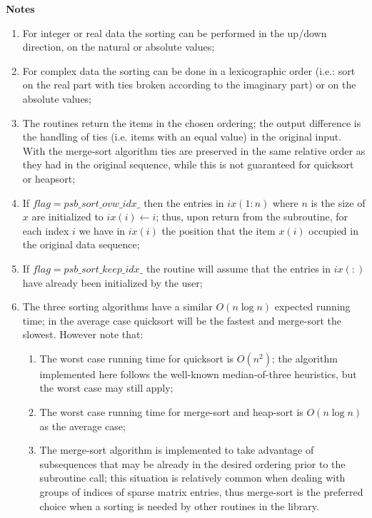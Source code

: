 {\goodbreak\par\noindent\large\bfseries Notes}
\begin{enumerate}
\item For integer or real data the sorting can be performed in the up/down direction, on the
  natural or absolute values;
\item For  complex data the sorting can  be done in a lexicographic
  order (i.e.: sort on the real part with ties broken according to
  the imaginary part) or on the absolute values; 
\item The routines return the items in the chosen ordering; the
  output difference is the handling of  ties (i.e. items with an
  equal   value) in the original input. With the merge-sort algorithm
  ties are   preserved in the same relative order as they had in the
  original   sequence,  while this is not guaranteed for quicksort or
  heapsort; 
\item If $flag = psb\_sort\_ovw\_idx\_$ then the entries in $ix(1:n)$
  where $n$ is the size of $x$ are initialized to $ix(i) \leftarrow
  i$; thus, upon return from the subroutine, for each
  index $i$ we have in $ix(i)$ the position that the item $x(i)$
  occupied in the original data sequence;
\item If $flag = psb\_sort\_keep\_idx\_$  the routine will assume that
  the entries in $ix(:)$ have already been initialized by the user;
\item The three sorting algorithms have a similar $O(n \log n)$ expected
  running time; in the average case quicksort will be the
  fastest and merge-sort the slowest. However note that:
\begin{enumerate}
\item The worst case running time for quicksort is $O(n^2)$; the algorithm
  implemented here follows the well-known median-of-three heuristics,
  but the worst case may still apply;
\item The worst case running time for merge-sort and heap-sort is
  $O(n\log n)$  as the average case;
\item The merge-sort algorithm is implemented to take advantage of 
  subsequences that may be already in the desired ordering prior to
  the subroutine call; this situation is relatively common when
  dealing with groups of indices of sparse matrix entries, thus
  merge-sort is the preferred  choice when a sorting is needed
  by other routines in the library. 
\end{enumerate}
\end{enumerate}



